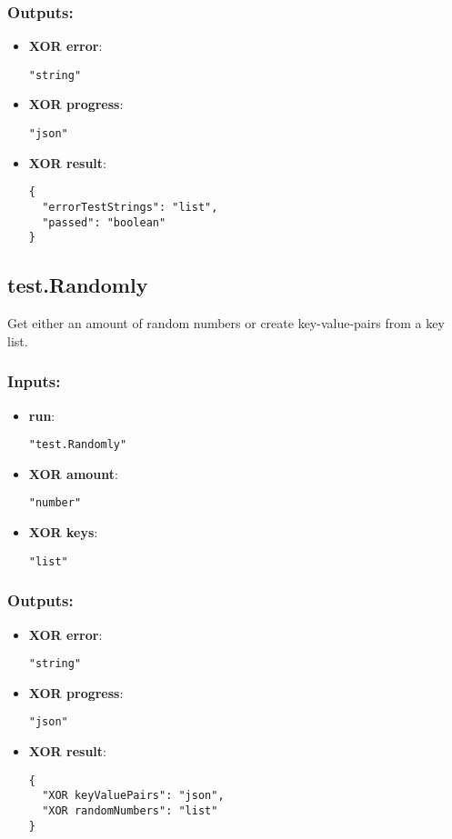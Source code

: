 \subsubsection*{Outputs:}
\begin{itemize}
    \item \textbf{XOR error}: 
\begin{lstlisting}
"string"
\end{lstlisting}
    \item \textbf{XOR progress}: 
\begin{lstlisting}
"json"
\end{lstlisting}
    \item \textbf{XOR result}: 
\begin{lstlisting}
{
  "errorTestStrings": "list", 
  "passed": "boolean"
}
\end{lstlisting}
  \end{itemize}

\subsection{test.Randomly}
Get either an amount of random numbers or create key-value-pairs from a key list.
\subsubsection*{Inputs:}
\begin{itemize}
    \item \textbf{run}: 
\begin{lstlisting}
"test.Randomly"
\end{lstlisting}
    \item \textbf{XOR amount}: 
\begin{lstlisting}
"number"
\end{lstlisting}
    \item \textbf{XOR keys}: 
\begin{lstlisting}
"list"
\end{lstlisting}
  \end{itemize}

\subsubsection*{Outputs:}
\begin{itemize}
    \item \textbf{XOR error}: 
\begin{lstlisting}
"string"
\end{lstlisting}
    \item \textbf{XOR progress}: 
\begin{lstlisting}
"json"
\end{lstlisting}
    \item \textbf{XOR result}: 
\begin{lstlisting}
{
  "XOR keyValuePairs": "json", 
  "XOR randomNumbers": "list"
}
\end{lstlisting}
  \end{itemize}

